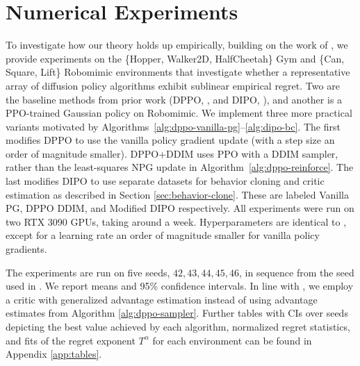 \section{Numerical Experiments}\label{ch05:sec:experiments}



To investigate how our theory holds up empirically, building on the work of \citet{ren2024diffusionpolicypolicyoptimization}, we provide experiments on the \{Hopper, Walker2D, HalfCheetah\} Gym \citep{brockman2016openaigym, towers2025gymnasiumstandardinterfacereinforcement} and \{Can, Square, Lift\} Robomimic \citep{robomimic2021} environments that investigate whether a representative array of diffusion policy algorithms exhibit sublinear empirical regret.
Two are the baseline methods from prior work (DPPO, \citealp{ren2024diffusionpolicypolicyoptimization}, and DIPO, \citealp{yang2023policyrepresentationdiffusionprobability}), and another is a PPO-trained Gaussian policy on Robomimic. 
We implement three more practical variants motivated by Algorithms~\ref{alg:dppo-vanilla-pg}--\ref{alg:dipo-bc}. The first modifies DPPO to use the vanilla policy gradient update (with a step size an order of magnitude smaller). DPPO+DDIM uses PPO with a DDIM sampler, rather than the least-squares NPG update in Algorithm~\ref{alg:dppo-reinforce}. The last modifies DIPO to use separate datasets for behavior cloning and critic estimation as described in Section \ref{sec:behavior-clone}. These are labeled Vanilla PG, DPPO DDIM, and Modified DIPO respectively. All experiments were run on two RTX 3090 GPUs, taking around a week. Hyperparameters are identical to \cite{ren2024diffusionpolicypolicyoptimization}, except for a learning rate an order of magnitude smaller for vanilla policy gradients.


The experiments are run on five seeds, $42,43,44,45,46$, in sequence from the seed used in
\citet{ren2024diffusionpolicypolicyoptimization}. We report means and 95\% confidence intervals. In line with \cite{ren2024diffusionpolicypolicyoptimization}, we employ a critic with generalized advantage estimation \citep{schulman2018gae} instead of using advantage estimates from Algorithm \ref{alg:dppo-sampler}. Further tables with CIs over seeds depicting the best value achieved by each algorithm, normalized regret statistics, and fits of the regret exponent $T^\alpha$ for each environment can be found in Appendix \ref{app:tables}.


